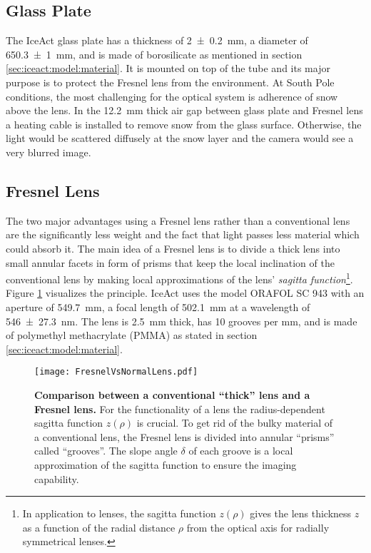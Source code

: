 \subsection{Glass Plate}\label{iceact:model:glassplate}

The IceAct glass plate has a thickness of \SI{2+-0.2}{\milli\meter}, a diameter of \SI{650.3+-1}{\milli\meter}, and is made of borosilicate as mentioned in section \ref{sec:iceact:model:material}. It is mounted on top of the tube and its major purpose is to protect the Fresnel lens from the environment. At South Pole conditions, the most challenging for the optical system is adherence of snow above the lens. In the \SI{12.2}{\milli\meter} thick air gap between glass plate and Fresnel lens a heating cable is installed to remove snow from the glass surface. Otherwise, the light would be scattered diffusely at the snow layer and the camera would see a very blurred image.

\subsection{Fresnel Lens}\label{iceact:model:fresnellens}

The two major advantages using a Fresnel lens rather than a conventional lens are the significantly less weight and the fact that light passes less material which could absorb it. The main idea of a Fresnel lens is to divide a thick lens into small annular facets in form of prisms that keep the local inclination of the conventional lens by making local approximations of the lens' \textit{sagitta function}\footnote{In application to lenses, the sagitta function $z(\rho)$ gives the lens thickness $z$ as a function of the radial distance $\rho$ from the optical axis for radially symmetrical lenses.}. Figure \ref{iceact:model:fresnelvsthick} visualizes the principle. IceAct uses the model ORAFOL SC 943 with an aperture of \SI{549.7}{\milli\meter}, a focal length of \SI{502.1}{\milli\meter} at a wavelength of \SI{546+-27.3}{\nano\meter}. The lens is \SI{2.5}{\milli\meter} thick, has 10 grooves per \si{\milli\meter}, and is made of polymethyl methacrylate (PMMA) as stated in section \ref{sec:iceact:model:material}. \cite{iceact:fresnellens:datasheet}

\begin{figure}[H]
	\centering
	\texttt{[image: FresnelVsNormalLens.pdf]}
	\caption[Comparison conventional vs. Fresnel lens]{\textbf{Comparison between a conventional \enquote{thick} lens and a Fresnel lens.} \cite{famous:eichler} For the functionality of a lens the radius-dependent sagitta function $z(\rho)$ is crucial. To get rid of the bulky material of a conventional lens, the Fresnel lens is divided into annular \enquote{prisms} called \enquote{grooves}. The slope angle $\delta$ of each groove is a local approximation of the sagitta function to ensure the imaging capability.}
	\label{iceact:model:fresnelvsthick}	
\end{figure}

